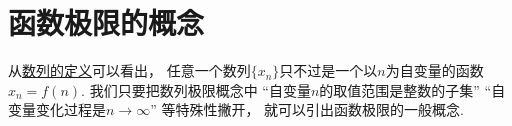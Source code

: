 \section{函数极限的概念}
从\hyperref[definition:数列.数列的定义]{数列的定义}可以看出，
任意一个数列\(\{x_n\}\)只不过是一个以\(n\)为自变量的函数\(x_n = f(n)\).
我们只要把数列极限概念中
“自变量\(n\)的取值范围是整数的子集”
“自变量变化过程是\(n\to\infty\)”
等特殊性撇开，
就可以引出函数极限的一般概念.



